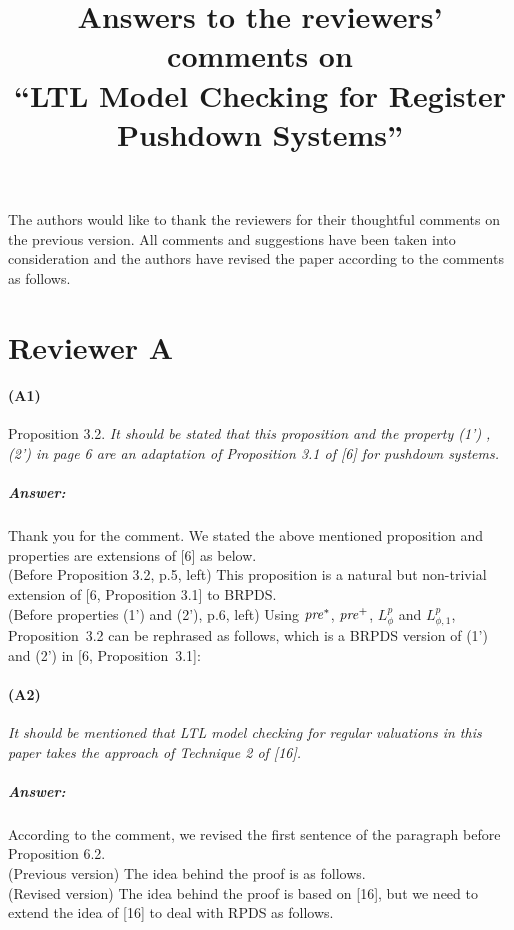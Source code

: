 \documentclass{article}
\title{Answers to the reviewers' comments on \\``LTL Model Checking for Register Pushdown Systems''}
\date{}
\begin{document}
\maketitle
The authors would like to thank the reviewers
for their thoughtful comments on the previous version.
All comments and suggestions have been taken into consideration
and the authors have revised the paper according to the comments as follows.

\newpage
{}

\section*{Reviewer A}

\paragraph{(A1)} Proposition 3.2. \newline
\textit{
It should be stated that this proposition and the property (1') , (2') in page 6 are an adaptation
of Proposition 3.1 of [6] for pushdown systems.
}
\subparagraph{Answer:}
Thank you for the comment.
We stated the above mentioned proposition and properties are extensions of [6] as below.
\medskip\noindent\\
(Before Proposition 3.2, p.5, left)
This proposition is a natural but non-trivial extension of
[6, Proposition 3.1] to BRPDS.
\medskip\noindent\\
(Before properties (1') and (2'), p.6, left)
Using $\mathit{pre}^*$, $\mathit{pre}^+$, $L_{\phi}^p$ and $L_{\phi,1}^p$,
Proposition~3.2 can be rephrased as follows,
which is a BRPDS version of (1') and (2') in
[6, Proposition~3.1]:

\paragraph{(A2)}
\textit{
It should be mentioned that LTL model checking for regular valuations in this paper takes the
approach of Technique 2 of [16].
}
\subparagraph{Answer:}
According to the comment,
we revised the first sentence of the paragraph before Proposition 6.2.
\medskip\noindent\\
(Previous version) The idea behind the proof is as follows.\\
(Revised version) The idea behind the proof is based on [16], but we need
to extend the idea of [16] to deal with RPDS as follows.
\medskip\noindent\\
\end{document}
